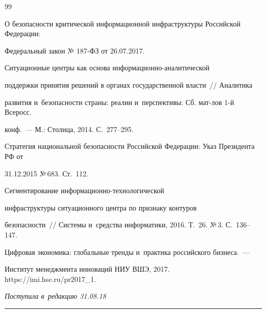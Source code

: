 {{\begin{thebibliography}{99}

О безопасности критической информационной инфраструктуры Российской Федерации: 

Федеральный закон № 187-ФЗ от 26.07.2017.


 Ситуационные центры как основа информационно-аналитической 

поддержки принятия решений в органах государственной власти~/\!\!/ Аналитика 

развития и~безопасности страны: реалии и~перспективы: Сб. мат-лов 1-й Всеросс.  

конф.~--- М.: Столица, 2014. С.~277--295. 


Стратегия национальной безопасности Российской Федерации: Указ Президента РФ от 

31.12.2015 №\,683. Ст.~112.


 Сегментирование информационно-тех\-но\-ло\-ги\-че\-ской 

инфраструктуры ситуационного центра по признаку контуров 

безопасности~/\!\!/ Системы и~средства информатики, 2016. Т.~26. №\,3. С.~136--147.




Цифровая экономика: глобальные тренды и~практика российского бизнеса.~--- 

Институт менеджмента инноваций НИУ ВШЭ, 2017. {\sf https://imi.hse.ru/pr2017\_1}.

        \end{thebibliography}

} }





\vspace*{-3pt}



\hfill{\small\textit{Поступила в~редакцию 31.08.18}}









\vspace*{10pt}



\hrule



